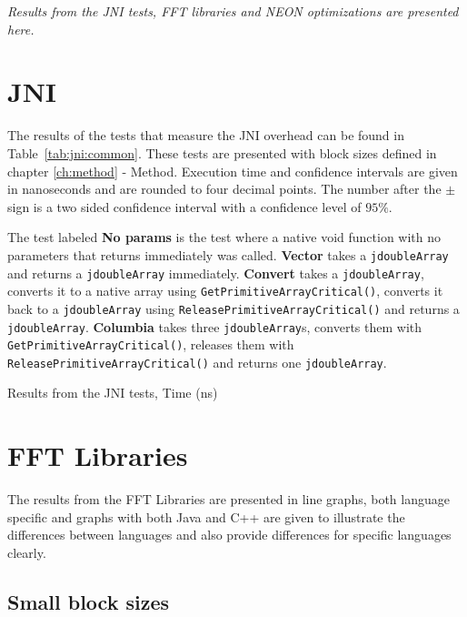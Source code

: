 \textit{Results from the JNI tests, FFT libraries and NEON optimizations are presented here.}

\section{JNI}
The results of the tests that measure the JNI overhead can be found in Table~\ref{tab:jni:common}. These tests are presented with block sizes defined in chapter \ref{ch:method} - Method. Execution time and confidence intervals are given in nanoseconds and are rounded to four decimal points. The number after the $\pm$ sign is a two sided confidence interval with a confidence level of $95\%$.

The test labeled \textbf{No params} is the test where a native void function with no parameters that returns immediately was called. \textbf{Vector} takes a \texttt{jdoubleArray} and returns a \texttt{jdoubleArray} immediately. \textbf{Convert} takes a \texttt{jdoubleArray}, converts it to a native array using \texttt{GetPrimitiveArrayCritical()}, converts it back to a \texttt{jdoubleArray} using \texttt{ReleasePrimitiveArrayCritical()} and returns a \texttt{jdoubleArray}. \textbf{Columbia} takes three \texttt{jdoubleArray}s, converts them with \texttt{GetPrimitiveArrayCritical()}, releases them with \texttt{ReleasePrimitiveArrayCritical()} and returns one \texttt{jdoubleArray}.

\begin{table}[H]
    \centering
    \caption{Results from the JNI tests, Time (ns)}
    \label{tab:jni:common}
    
\end{table}


\section{FFT Libraries}
The results from the FFT Libraries are presented in line graphs, both language specific and graphs with both Java and C++ are given to illustrate the differences between languages and also provide differences for specific languages clearly.

\subsection{Small block sizes}

